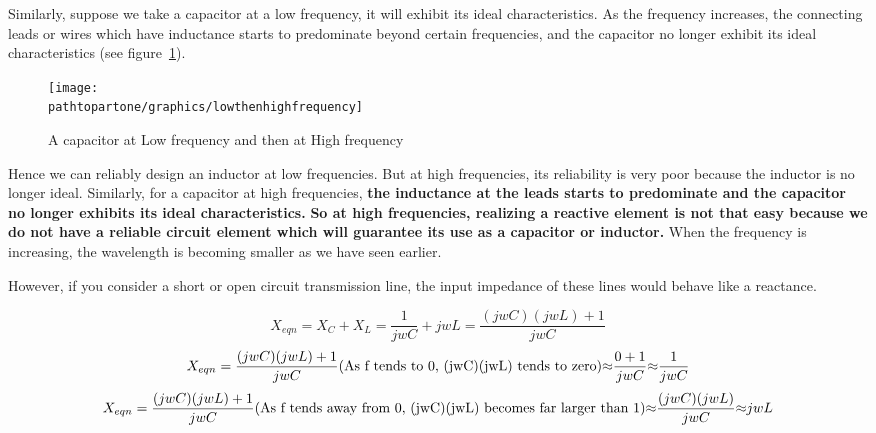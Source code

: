 Similarly, suppose we take a capacitor at a low frequency, it will exhibit its ideal characteristics. As the frequency increases, the connecting leads or wires which have inductance starts to predominate beyond certain frequencies, and the capacitor no longer exhibit its ideal characteristics (see figure~\ref{fig:lowthenhighfrequency}).

\begin{figure}[ht]
	\centering
	\texttt{[image: \\pathtopartone/graphics/lowthenhighfrequency]}
	\caption{A capacitor at Low frequency and then at High frequency}
	\label{fig:lowthenhighfrequency}
\end{figure}


Hence we can reliably design an inductor at low frequencies. But at high frequencies, its reliability is very poor because the inductor is no longer ideal. Similarly, for a capacitor at high frequencies, \textbf{the inductance at the leads starts to predominate and the capacitor no longer exhibits its ideal characteristics.} \textbf{So at high frequencies, realizing a reactive element is not that easy because we do not have a reliable circuit element which will guarantee its use as a capacitor or inductor.} When the frequency is increasing, the wavelength is becoming smaller as we have seen earlier. 

However, if you consider a short or open circuit transmission line, the input impedance of these lines would behave like a reactance.

\begin{dmath}
	{X_{eqn}} = {X_C} + {X_L}
			  =  \frac{1}{jwC} + jwL
      	      = \frac{(jwC)(jwL) + 1}{jwC}
\end{dmath}
\begin{dmath}	
	X_{eqn} = \frac{(jwC)(jwL) + 1}{jwC} \\
               \text{({As f tends to 0, (jwC)(jwL) tends to zero})} \\
              {\approx} \frac{0 + 1}{jwC} \\
                {\approx} \frac{1}{jwC}\\
\end{dmath}
\begin{dmath}
	X_{eqn} = \frac{(jwC)(jwL) + 1}{jwC} \\
              \text{({As f tends away from 0, (jwC)(jwL) becomes far larger than 1})} \\
              {\approx} \frac{(jwC)(jwL)}{jwC} \\
            {\approx} {jwL}
\end{dmath}


